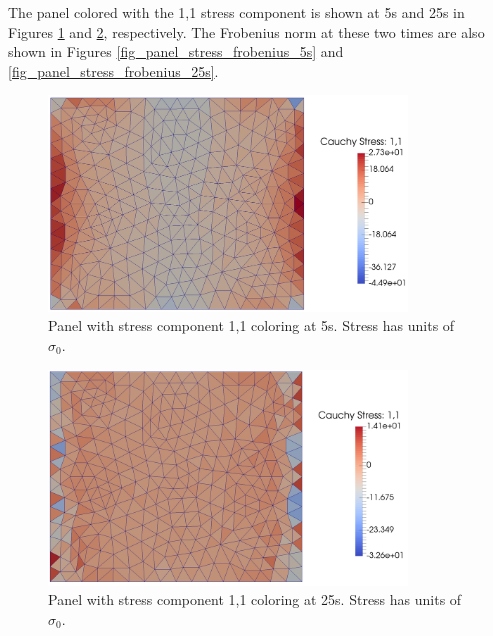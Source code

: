\documentclass[conf]{new-aiaa}
\begin{document}
The panel colored with the 1,1 stress component is shown at 5s
and 25s in Figures \ref{fig_panel_stress_5s} and 
\ref{fig_panel_stress_25s}, respectively.
The Frobenius norm at these two times are also shown 
in Figures \ref{fig_panel_stress_frobenius_5s}
and \ref{fig_panel_stress_frobenius_25s}.

\begin{figure}[H] 
  \centering
    \includegraphics[width=0.85\textwidth, keepaspectratio]
    {panel_stress_5s}
  \caption{ Panel with stress component 1,1 coloring at 5s.
            Stress has units of $\sigma_0$.}
  \label{fig_panel_stress_5s}
\end{figure}

\begin{figure}[H] 
  \centering
    \includegraphics[width=0.85\textwidth, keepaspectratio]
    {panel_stress_25s}
  \caption{ Panel with stress component 1,1 coloring at 25s.
            Stress has units of $\sigma_0$.}
  \label{fig_panel_stress_25s}
\end{figure}
\end{document}
